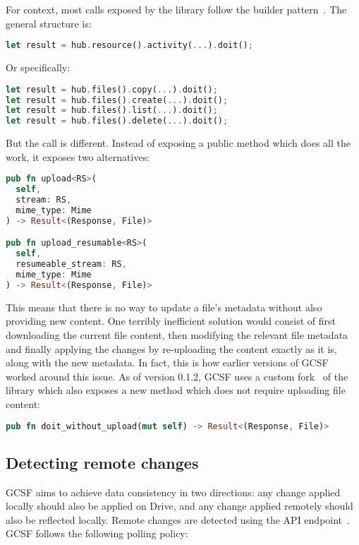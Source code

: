 For context, most calls exposed by the library follow the builder pattern~\cite{gof}. The general structure is:

\begin{lstlisting}[language=Rust, frame=single]
let result = hub.resource().activity(...).doit();
\end{lstlisting}

Or specifically:

\begin{lstlisting}[language=Rust, frame=single]
let result = hub.files().copy(...).doit();
let result = hub.files().create(...).doit();
let result = hub.files().list(...).doit();
let result = hub.files().delete(...).doit();
\end{lstlisting}

But the  call is different. Instead of exposing a public  method which does all the work, it exposes two alternatives:

\begin{lstlisting}[language=Rust, frame=single]
pub fn upload<RS>(
  self,
  stream: RS,
  mime_type: Mime
) -> Result<(Response, File)>

pub fn upload_resumable<RS>(
  self,
  resumeable_stream: RS,
  mime_type: Mime
) -> Result<(Response, File)>
\end{lstlisting}

This means that there is no way to update a file's metadata without also providing new content. One terribly inefficient solution would consist of first downloading the current file content, then modifying the relevant file metadata and finally applying the changes by re-uploading the content exactly as it is, along with the new metadata. In fact, this is how earlier versions of GCSF worked around this issue. As of version 0.1.2, GCSF uses a custom fork~\cite{google_drive3_fork} of the library which also exposes a new method which does not require uploading file content:

\begin{lstlisting}[language=Rust, frame=single]
pub fn doit_without_upload(mut self) -> Result<(Response, File)>
\end{lstlisting}

\subsection{Detecting remote changes}

GCSF aims to achieve data consistency in two directions: any change applied locally should also be applied on Drive, and any change applied remotely should also be reflected locally. Remote changes are detected using the  API endpoint~\cite{changes_list_endpoint}. GCSF follows the following polling policy:

